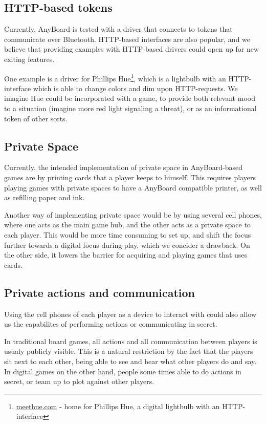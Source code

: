 \subsection{HTTP-based tokens}
Currently, AnyBoard is tested with a driver that connects to tokens that communicate over Bluetooth. HTTP-based interfaces are also popular, and we believe that providing examples with HTTP-based drivers could open up for new exiting features. 

One example is a driver for Phillips Hue\footnote{\href{http://www2.meethue.com/no-no/}{meethue.com} - home for Phillips Hue, a digital lightbulb with an HTTP-interface}, which is a lightbulb with an HTTP-interface which is able to change colors and dim upon HTTP-requests. We imagine Hue could be incorporated with a game, to provide both relevant mood to a situation (imagine more red light signaling a threat), or as an informational token of other sorts.

\subsection{Private Space}
Currently, the intended implementation of private space in AnyBoard-based games are by printing cards that a player keeps to himself. This requires players playing games with private spaces to have a AnyBoard compatible printer, as well as refilling paper and ink.

Another way of implementing private space would be by using several cell phones, where one acts as the main game hub, and the other acts as a private space to each player. This would be more time consuming to set up, and shift the focus further towards a digital focus during play, which we concider a drawback. On the other side, it lowers the barrier for acquiring and playing games that uses cards.

\subsection{Private actions and communication}
Using the cell phones of each player as a device to interact with could also allow us the capabilites of performing actions or communicating in secret.

In traditional board games, all actions and all communication between players is usualy publicly visible. This is a natural restriction by the fact that the players sit next to each other, being able to see and hear what other players do and say. In digital games on the other hand, people some times able to do actions in secret, or team up to plot against other players.

